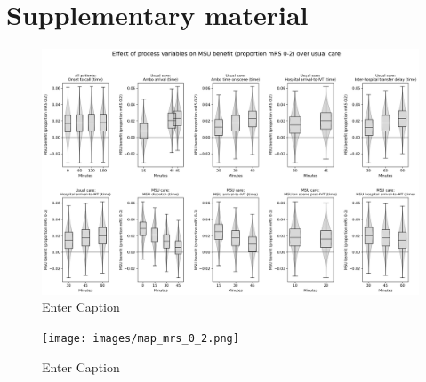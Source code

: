 \section{Supplementary material}


\begin{figure}
    \centering
    \includegraphics[width=1\linewidth]{images/msu_net_mrs_0-2_benefit.png}
    \caption{Enter Caption}
    \label{fig:enter-label}
\end{figure}

\begin{figure}
    \centering
    \texttt{[image: images/map\_mrs\_0\_2.png]}
    \caption{Enter Caption}
    \label{fig:enter-label}
\end{figure}
